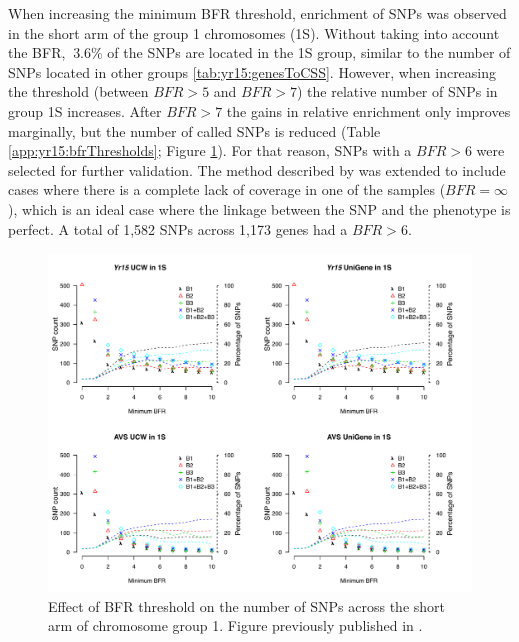 

When increasing the minimum BFR threshold, enrichment of SNPs was observed in the short arm of the group 1 chromosomes (1S). 
Without taking into account the BFR, $~3.6\%$ of the SNPs are located in the 1S group, similar to the number of SNPs located in other groups \ref{tab:yr15:genesToCSS}. 
However, when increasing the threshold  (between $BFR > 5 $ and $BFR > 7$) the relative number of SNPs in group 1S increases. 
After $BFR>7$ the gains in relative enrichment only improves marginally, but the number of called SNPs is reduced (Table \ref{app:yr15:bfrThresholds}; Figure \ref{fig:yr15:bfrChange}).
For that reason, SNPs with a $BFR>6$ were selected for further validation. 
The method described by \citet{Trick2012} was extended to include cases where there is a complete lack of coverage in one of the samples ($BFR=\infty$), which is an ideal case where the linkage between the SNP and the phenotype is perfect. 
A total of 1,582 SNPs across 1,173 genes had a $BFR>6$.



\begin{figure}
\includegraphics[width=1\textwidth]{Yr15/Figures/bfrChanges.pdf}
\caption[Effect of BFR threshold on the number of SNPs]{Effect of BFR threshold on the number of SNPs across the short arm of chromosome group 1. Figure previously published in \citet{Ramirez-Gonzalez2015b}. }
\label{fig:yr15:bfrChange}
\end{figure}

